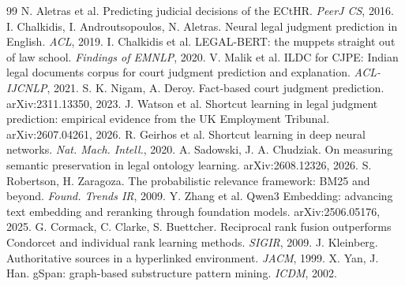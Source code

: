 \documentclass[12pt,a4paper]{article}
\begin{document}
\begin{thebibliography}{99}
\setlength{\itemsep}{0pt}\setlength{\parsep}{0pt}\setlength{\parskip}{0pt}
 N. Aletras et al. Predicting judicial decisions of the ECtHR. \emph{PeerJ CS}, 2016.
 I. Chalkidis, I. Androutsopoulos, N. Aletras. Neural legal judgment prediction in English. \emph{ACL}, 2019.
 I. Chalkidis et al. LEGAL-BERT: the muppets straight out of law school. \emph{Findings of EMNLP}, 2020.
 V. Malik et al. ILDC for CJPE: Indian legal documents corpus for court judgment prediction and explanation. \emph{ACL-IJCNLP}, 2021.
 S. K. Nigam, A. Deroy. Fact-based court judgment prediction. arXiv:2311.13350, 2023.
 J. Watson et al. Shortcut learning in legal judgment prediction: empirical evidence from the UK Employment Tribunal. arXiv:2607.04261, 2026.
 R. Geirhos et al. Shortcut learning in deep neural networks. \emph{Nat. Mach. Intell.}, 2020.
 A. Sadowski, J. A. Chudziak. On measuring semantic preservation in legal ontology learning. arXiv:2608.12326, 2026.
 S. Robertson, H. Zaragoza. The probabilistic relevance framework: BM25 and beyond. \emph{Found. Trends IR}, 2009.
 Y. Zhang et al. Qwen3 Embedding: advancing text embedding and reranking through foundation models. arXiv:2506.05176, 2025.
 G. Cormack, C. Clarke, S. Buettcher. Reciprocal rank fusion outperforms Condorcet and individual rank learning methods. \emph{SIGIR}, 2009.
 J. Kleinberg. Authoritative sources in a hyperlinked environment. \emph{JACM}, 1999.
 X. Yan, J. Han. gSpan: graph-based substructure pattern mining. \emph{ICDM}, 2002.
\end{thebibliography}
\end{document}
